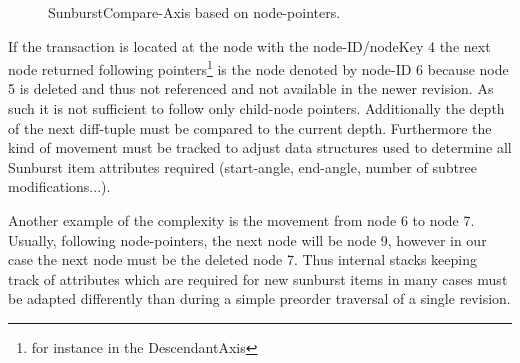 \begin{figure}[tb]
\caption{\label{fig:tree-axis} SunburstCompare-Axis based on node-pointers.}
\end{figure}

If the transaction is located at the node with the node-ID/nodeKey 4 the next node returned following pointers\footnote{for instance in the DescendantAxis} is the node denoted by node-ID 6 because node 5 is deleted and thus not referenced and not available in the newer revision. As such it is not sufficient to follow only child-node pointers. Additionally the depth of the next diff-tuple must be compared to the current depth. Furthermore the kind of movement must be tracked to adjust data structures used to determine all Sunburst item attributes required (start-angle, end-angle, number of subtree modifications...).

Another example of the complexity is the movement from node 6 to node 7. Usually, following node-pointers, the next node will be node 9, however in our case the next node must be the deleted node 7. Thus internal stacks keeping track of attributes which are required for new sunburst items in many cases must be adapted differently than during a simple preorder traversal of a single revision.  %

